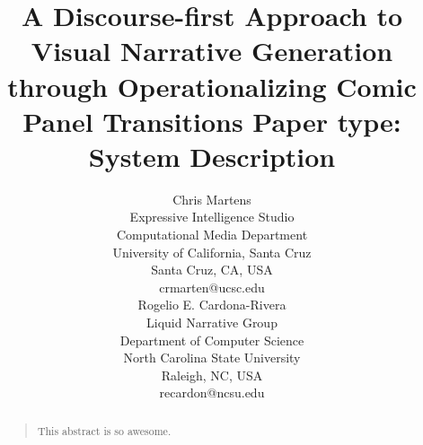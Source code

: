 \documentclass[letterpaper]{article}
\title{
	A Discourse-first Approach to Visual Narrative Generation 
	through Operationalizing Comic Panel Transitions \break
	Paper type: System Description
}
\author{
	Chris Martens\\
	Expressive Intelligence Studio\\
	Computational Media Department\\
	University of California, Santa Cruz\\
	Santa Cruz, CA, USA\\
	crmarten@ucsc.edu\\
	\And
	Rogelio E. Cardona-Rivera\\
	Liquid Narrative Group\\
	Department of Computer Science\\
	North Carolina State University\\
	Raleigh, NC, USA\\
	recardon@ncsu.edu\\
}
\begin{document}
 
\maketitle
\begin{abstract}
	\begin{quote}
		This abstract is so awesome.
	\end{quote}
\end{abstract}





















\end{document}
